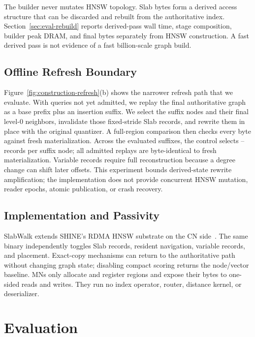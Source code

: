 \documentclass[sigconf,nonacm]{acmart}
\begin{document}
The builder never mutates HNSW topology.  Slab bytes form a derived access
structure that can be discarded and rebuilt from the authoritative index.
Section~\ref{sec:eval-rebuild} reports derived-pass wall time, stage
composition, builder peak DRAM, and final bytes separately from HNSW
construction.  A fast derived pass is not evidence of a fast billion-scale
graph build.

\subsection{Offline Refresh Boundary}

Figure~\ref{fig:construction-refresh}(b) shows the narrower refresh path that
we evaluate.  With queries not yet admitted, we replay the final authoritative
graph as a base prefix plus an insertion suffix.  We select the suffix nodes
and their final level-0 neighbors, invalidate those fixed-stride Slab records,
and rewrite them in place with the original quantizer.  A full-region
comparison then checks every byte against fresh materialization.  Across the
evaluated suffixes, the control selects
\ClaimRefreshMinRecords--\ClaimRefreshMaxRecords{} records per suffix node; all
admitted replays are byte-identical to fresh materialization.  Variable records
require full reconstruction because a degree
change can shift later offsets.  This experiment bounds derived-state rewrite
amplification; the implementation does not provide concurrent HNSW mutation,
reader epochs, atomic publication, or crash recovery.

\subsection{Implementation and Passivity}

SlabWalk extends SHINE's RDMA HNSW substrate on the CN side~\cite{shine}.
The same binary independently toggles Slab records, resident navigation,
variable records, and placement.  Exact-copy mechanisms can return to the
authoritative path without changing graph state; disabling compact scoring
returns the node/vector baseline.  MNs only allocate and register regions and
expose their bytes to one-sided reads and writes.  They run no index operator, router,
distance kernel, or deserializer.

\section{Evaluation}
\label{sec:eval}
\end{document}
